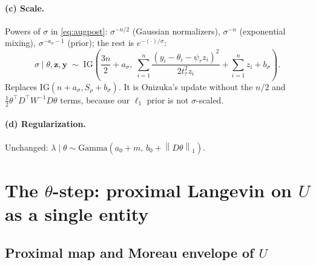 \documentclass[12pt]{article}
\newcommand{\by}{\bm{y}}
\newcommand{\bz}{\bm{z}}
\newcommand{\norm}[1]{\left\lVert#1\right\rVert}
\newcommand{\IG}{\mathrm{IG}}
\begin{document}
\paragraph{(c) Scale.} Powers of $\sigma$ in \eqref{eq:augpost}: $\sigma^{-n/2}$ (Gaussian
normalizers), $\sigma^{-n}$ (exponential mixing), $\sigma^{-a_\sigma-1}$ (prior); the rest is
$e^{-(\cdot)/\sigma}$:
\begin{equation}
    \sigma\mid\theta,\bz,\by\;\sim\;
    \IG\!\left(\frac{3n}{2}+a_\sigma,\;
    \sum_{i=1}^n\frac{(y_i-\theta_i-\psi_\tau z_i)^2}{2t_\tau^2 z_i}+\sum_{i=1}^n z_i+b_\sigma\right).
    \label{eq:sigmaupdate}
\end{equation}
Replaces $\IG(n+a_\sigma,S_\rho+b_\sigma)$. It is Onizuka's update without the $n/2$ and
$\tfrac12\theta^\top D^\top W^{-1}D\theta$ terms, because our $\ell_1$ prior is not $\sigma$-scaled.

\paragraph{(d) Regularization.} Unchanged: $\lambda\mid\theta\sim\mathrm{Gamma}(a_0+m,\,b_0+\norm{D\theta}_1)$.

\section{The $\theta$-step: proximal Langevin on $U$ as a single entity}\label{sec:prox}

\subsection{Proximal map and Moreau envelope of $U$}
\end{document}
